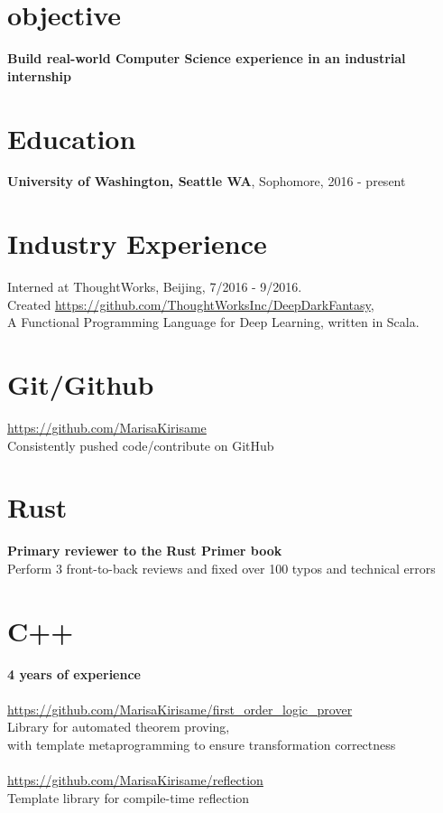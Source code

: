 \documentclass[margin,line]{res}
\begin{document}

\begin{resume}



\section{\sc objective}
\textbf{Build real-world Computer Science experience in an industrial internship}

\section{\sc Education}
\textbf{University of Washington, Seattle WA}, Sophomore, 2016 - present

\section{Industry Experience} Interned at ThoughtWorks, Beijing, 7/2016 - 9/2016. \\ Created \url{https://github.com/ThoughtWorksInc/DeepDarkFantasy}, \\
A Functional Programming Language for Deep Learning, written in Scala. 

\section{\sc Git/Github}
\url{https://github.com/MarisaKirisame} \\
Consistently pushed code/contribute on GitHub

\section{\sc Rust}
\textbf{Primary reviewer to the Rust Primer book} \\
Perform 3 front-to-back reviews and fixed over 100 typos and technical errors

\section{\sc C++} 
\textbf{4 years of experience} \\
\\
\url{https://github.com/MarisaKirisame/first_order_logic_prover} \\
Library for automated theorem proving, \\
with template metaprogramming to ensure transformation correctness \\
\\
\url{https://github.com/MarisaKirisame/reflection} \\
Template library for compile-time reflection


\end{resume}
\end{document}
